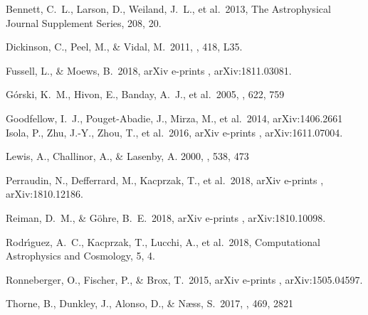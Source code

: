 \documentclass[floatfix]{emulateapj}
\begin{document}
\begin{thebibliography}{99}

 Bennett, C.~L., Larson, D., Weiland, J.~L., et al.\ 2013, The Astrophysical Journal Supplement Series, 208, 20.

 Dickinson, C., Peel, M., \& Vidal, M.\ 2011, \mnras, 418, L35.

 Fussell, L., \& Moews, B.\ 2018, arXiv e-prints , arXiv:1811.03081.

 G{\'o}rski, K.~M., Hivon, E., Banday, A.~J., et al.\ 2005, \apj, 622, 759

 Goodfellow, I.~J., Pouget-Abadie, J., Mirza, M., et al.\ 2014, arXiv:1406.2661 
 Isola, P., Zhu, J.-Y., Zhou, T., et al.\ 2016, arXiv e-prints , arXiv:1611.07004.

 Lewis, A., Challinor, A., \& Lasenby, A. 2000, \apj, 538, 473

 Perraudin, N., Defferrard, M., Kacprzak, T., et al.\ 2018, arXiv e-prints , arXiv:1810.12186.

 Reiman, D.~M., \& G{\"o}hre, B.~E.\ 2018, arXiv e-prints , arXiv:1810.10098.

 Rodr{\'\i}guez, A.~C., Kacprzak, T., Lucchi, A., et al.\ 2018, Computational Astrophysics and Cosmology, 5, 4.

 Ronneberger, O., Fischer, P., \& Brox, T.\ 2015, arXiv e-prints , arXiv:1505.04597.


 Thorne, B., Dunkley, J., Alonso, D., \& N{\ae}ss, S.\ 2017, \mnras, 469, 2821



\end{thebibliography}

%
%
\end{document}
